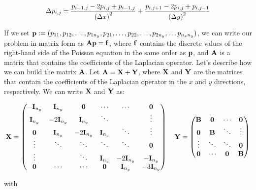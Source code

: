 \begin{equation*}
  \Delta p_{i,j} = \frac{p_{i+1,j} - 2 p_{i,j} + p_{i-1,j}}{{(\Delta x)}^2} + \frac{p_{i,j+1} - 2 p_{i,j} + p_{i,j-1}}{{(\Delta y)}^2}
\end{equation*}

If we set $\boldsymbol{\mathrm{p}}:=(p_{11}, p_{12}, \ldots, p_{1n_y}, p_{21}, \ldots, p_{22}, \ldots, p_{2n_y},\ldots p_{n_xn_y})$, we can write our problem in matrix form as $\boldsymbol{\mathrm{A}}\boldsymbol{\mathrm{p}}=\boldsymbol{\mathrm{f}}$, where $\boldsymbol{\mathrm{f}}$ contains the discrete values of the right-hand side of the Poisson equation in the same order as $\boldsymbol{\mathrm{p}}$, and $\boldsymbol{\mathrm{A}}$ is a matrix that contains the coefficients of the Laplacian operator. Let's describe how we can build the matrix $\boldsymbol{\mathrm{A}}$. Let $\boldsymbol{\mathrm{A}}=\boldsymbol{\mathrm{X}} + \boldsymbol{\mathrm{Y}}$, where $\boldsymbol{\mathrm{X}}$ and $\boldsymbol{\mathrm{Y}}$ are the matrices that contain the coefficients of the Laplacian operator in the $x$ and $y$ directions, respectively. We can write $\boldsymbol{\mathrm{X}}$ and $\boldsymbol{\mathrm{Y}}$ as:

\begin{equation*}
  \boldsymbol{\mathrm{X}} = \begin{pmatrix}
    -\boldsymbol{\mathrm{I}}_{n_y} & \boldsymbol{\mathrm{I}}_{n_y}   & \boldsymbol{\mathrm{0}}         & \cdots       & \cdots         & \boldsymbol{\mathrm{0}}         \\
    \boldsymbol{\mathrm{I}}_{n_y}  & -2\boldsymbol{\mathrm{I}}_{n_y} & \boldsymbol{\mathrm{I}}_{n_y}   & \ddots       &                & \vdots         \\
    \boldsymbol{\mathrm{0}}        & \boldsymbol{\mathrm{I}}_{n_y}   & -2\boldsymbol{\mathrm{I}}_{n_y} & \boldsymbol{\mathrm{I}}_{n_y} & \ddots         & \vdots         \\
    \vdots        & \ddots         & \ddots         & \ddots       & \ddots         & \boldsymbol{\mathrm{0}}         \\
    \vdots        &                & \ddots         & \boldsymbol{\mathrm{I}}_{n_y} & -2\boldsymbol{\mathrm{I}}_{n_y} & -\boldsymbol{\mathrm{I}}_{n_y}  \\
    \boldsymbol{\mathrm{0}}        & \cdots         & \cdots         & \boldsymbol{\mathrm{0}}       & \boldsymbol{\mathrm{I}}_{n_y}   & -3\boldsymbol{\mathrm{I}}_{n_y} \\
  \end{pmatrix}\quad
  \boldsymbol{\mathrm{Y}} = \begin{pmatrix}
    \boldsymbol{\mathrm{B}} & \boldsymbol{\mathrm{0}} & \cdots & \boldsymbol{\mathrm{0}} \\
    \boldsymbol{\mathrm{0}} & \boldsymbol{\mathrm{B}} & \ddots & \vdots \\
    \vdots & \ddots & \ddots & \boldsymbol{\mathrm{0}} \\
    \boldsymbol{\mathrm{0}} & \cdots & \boldsymbol{\mathrm{0}} & \boldsymbol{\mathrm{B}} \\
  \end{pmatrix}
\end{equation*}

with

